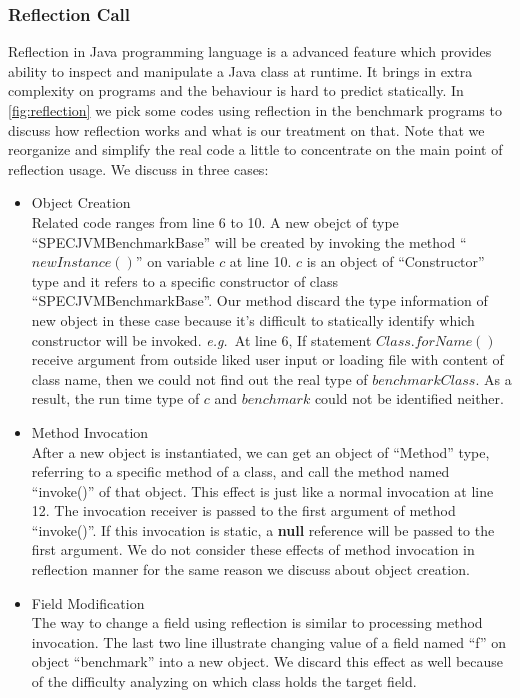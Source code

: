 \documentclass{fac}
\newcommand\eg{\textit{e.g.\ }}
\begin{document}
\subsubsection{Reflection Call}\label{subsubsec:reflection-call}
Reflection in Java programming language is a advanced feature which provides ability to inspect and manipulate a Java class at runtime. It brings in extra complexity on programs and the behaviour is hard to predict statically. In \ref{fig:reflection} we pick some codes using reflection in the benchmark programs to discuss how reflection works and what is our treatment on that. Note that we reorganize and simplify the real code a little to concentrate on the main point of reflection usage. We discuss in three cases:
\begin{itemize}
\item Object Creation \\
Related code ranges from line 6 to 10. A new obejct of type ``SPECJVMBenchmarkBase'' will be created by invoking the method ``$newInstance()$'' on variable $c$ at line 10. $c$ is an object of ``Constructor'' type and it refers to a specific constructor of class ``SPECJVMBenchmarkBase''. Our method discard the type information of new object in these case because it's difficult to statically identify which constructor will be invoked. \eg At line 6, If statement $Class.forName()$ receive argument from outside liked user input or loading file with content of class name, then we could not find out the real type of $benchmarkClass$. As a result, the run time type of $c$ and $benchmark$ could not be identified neither.
\item Method Invocation\\
After a new object is instantiated, we can get an object of ``Method'' type, referring to a specific method of a class, and call the method named ``invoke()'' of that object. This effect is just like a normal invocation at line 12. The invocation receiver is passed to the first argument of method ``invoke()''. If this invocation is static, a \textbf{null} reference will be passed to the first argument. We do not consider these effects of method invocation in reflection manner for the same reason we discuss about object creation.
\item Field Modification\\
The way to change a field using reflection is similar to processing method invocation. The last two line illustrate changing value of a field named ``f'' on object ``benchmark'' into a new object. We discard this effect as well because of the difficulty analyzing on which class holds the target field.
\end{itemize}
\end{document}
